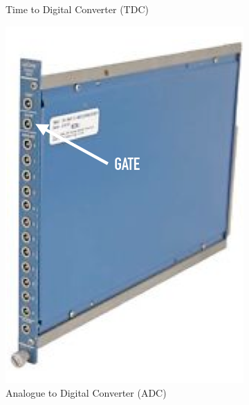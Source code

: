 \begin{figure}[!h]
\begin{subfigure}[t]{0.2\textwidth}
        \caption{Time to Digital Converter (TDC)}
        \label{fig:TDC}
    \end{subfigure}
    \hfill	
    \begin{subfigure}[t]{0.25\textwidth}
        \includegraphics[height=0.25\textheight, width=\textwidth, keepaspectratio]{figures/gate.png}
        \caption{Analogue to Digital Converter (ADC)}
        \label{fig:}
    \end{subfigure}    
    \hfill
    \begin{subfigure}[t]{0.45\textwidth}

\end{subfigure}
\end{figure}
